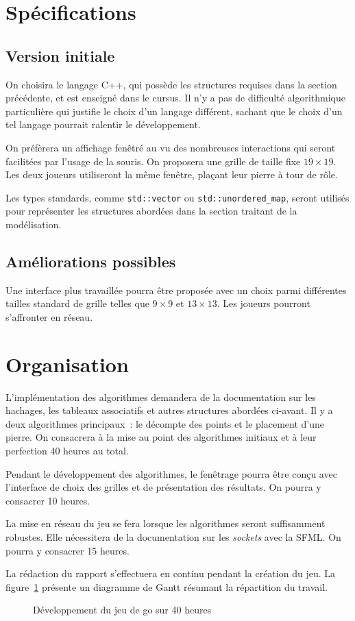 \section{Spécifications}

\subsection{Version initiale}

On choisira le langage C++, qui possède les structures requises dans
la section précédente, et est enseigné dans le cursus. Il n'y a pas de difficulté
algorithmique particulière qui justifie le choix d'un langage différent,
sachant que le choix d'un tel langage pourrait ralentir le développement.

On préfèrera un affichage fenêtré au vu des nombreuses interactions
qui seront facilitées par l'usage de la souris. On proposera une
grille de taille fixe $19 \times 19.$
Les deux joueurs utiliseront la même fenêtre, plaçant leur
pierre à tour de rôle.

Les types standards, comme
\texttt{std::vector} ou \texttt{std::unordered\_map}, seront utilisés
pour représenter les structures abordées dans la section traitant
de la modélisation.

\subsection{Améliorations possibles}

Une interface plus travaillée pourra être proposée avec un
choix parmi différentes tailles standard de grille telles que
$9 \times 9$ et $13 \times 13.$
Les joueurs pourront s'affronter en réseau.

\section{Organisation}

L'implémentation des algorithmes
demandera de la documentation sur les hachages, les
tableaux associatifs et autres structures abordées ci-avant.
Il y a deux algorithmes principaux~: le décompte des points
et le placement d'une pierre. On consacrera à la mise au point
des algorithmes initiaux et à leur perfection 40 heures au total.

Pendant le développement des algorithmes, le fenêtrage
pourra être conçu avec l'interface de choix des grilles
et de présentation des résultats. On pourra y consacrer
10 heures.

La mise en réseau du jeu se fera lorsque les algorithmes
seront suffisamment robustes. Elle nécessitera de la
documentation sur les \emph{sockets} avec la SFML. On
pourra y consacrer 15 heures.

La rédaction du rapport s'effectuera en continu pendant la création du jeu.
La figure~\ref{fig:go-gantt} présente un diagramme de Gantt résumant
la répartition du travail.

\begin{figure}[h!]
    \centering
    
    \caption{Développement du jeu de go sur 40 heures}
    \label{fig:go-gantt}
\end{figure}
